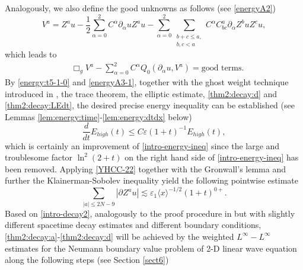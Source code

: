 \documentclass[11pt,twoside]{article}
\def\p{\partial}
\def\ve{\varepsilon}
\def\ls{\lesssim}
\newcommand{\w}[1]{\langle {#1} \rangle}
\theoremstyle{plain}
\theoremstyle{definition}
\numberwithin{equation}{section}
\begin{document}
Analogously, we also define the good unknowns as follows (see \eqref{energyA2})
\begin{equation}\label{energyA2-1}
V^a=Z^au-\frac12\sum_{\alpha=0}^2C^{\alpha}\p_{\alpha}uZ^au
-\sum_{\alpha=0}^2\sum_{\substack{b+c\le a,\\b,c<a}}C^{\alpha}C^a_{bc}\p_{\alpha}Z^buZ^cu,
\end{equation}
which leads to
\begin{equation}\label{energyA3-1}
\begin{split}
&\Box_gV^a-\sum_{\alpha=0}^2C^{\alpha}Q_0(\p_{\alpha}u,V^a)
=\text{good terms}.
\end{split}
\end{equation}
By \eqref{energy:t5-1-0} and \eqref{energyA3-1}, together with the ghost weight technique introduced in \cite{Alinhac01a}, the trace theorem, the elliptic estimate, \eqref{thm2:decay:d} and \eqref{thm2:decay:LEdt}, the desired precise energy inequality can be established (see Lemmas \ref{lem:energy:time}-\ref{lem:energy:dtdx} below)
\begin{equation}\label{YHCC-22}
\frac{d}{dt}E_{high}(t)\le C\ve(1+t)^{-1}E_{high}(t),
\end{equation}
which is certainly an improvement of \eqref{intro-energy-ineq} since the large and troublesome factor $\ln^2(2+t)$
on the right hand side of \eqref{intro-energy-ineq} has been removed.
Applying \eqref{YHCC-22} together with the Gronwall's lemma and further the Klainerman-Sobolev inequality
yield the following pointwise estimate
\begin{equation}\label{intro-decay2}
\sum_{|a|\le2N-9}|\p Z^au|\ls\ve_1\w{x}^{-1/2}(1+t)^{0+}.
\end{equation}
Based on \eqref{intro-decay2}, analogously to the proof procedure in \cite{HouYinYuan24} but with slightly different spacetime decay estimates
and different boundary conditions, \eqref{thm2:decay:a}-\eqref{thm2:decay:d} will be achieved by the weighted $L^\infty-L^\infty$
estimates for the Neumann boundary value problem of 2-D linear wave equation
along the following steps (see Section \ref{sect6})
\end{document}
